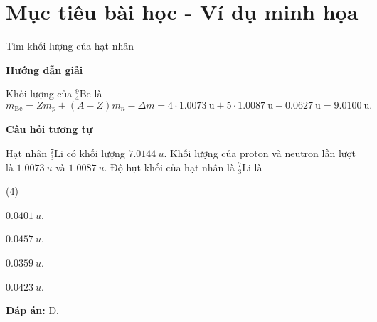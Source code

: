 	
\section{Mục tiêu bài học - Ví dụ minh họa}

\begin{dang}{Tìm khối lượng của hạt nhân}

	
	{\begin{center}
		\textbf{Hướng dẫn giải}
	\end{center}

	Khối lượng của $^9_4\text{Be}$ là
	\begin{equation*}
	m_\text{Be}= Z m_p+ (A-Z) m_n - \Delta m = 4\cdot \SI{1,0073}{\atomicmassunit} + 5 \cdot \SI{1,0087}{\atomicmassunit} - \SI{0,0627}{\atomicmassunit} = \SI{9,0100}{\atomicmassunit}.
	\end{equation*}
	
	\begin{center}
		\textbf{Câu hỏi tương tự}
	\end{center}
	
Hạt nhân $ ^7_{3} \text{Li} $ có khối lượng $ \SI{7,0144}{u} $. Khối lượng của proton và neutron lần lượt là $ \SI{1,0073}{u} $ và $ \SI{1,0087}{u} $. Độ hụt khối của hạt nhân là $ ^7_{3} \text{Li} $ là
\begin{mcq}(4)
	\item $ \SI{0,0401}{u} $.
	\item $ \SI{0,0457}{u} $.
	\item $ \SI{0,0359}{u} $.
	\item $ \SI{0,0423}{u} $.
\end{mcq}
	\textbf{Đáp án:} D.}
	
\end{dang}
	
